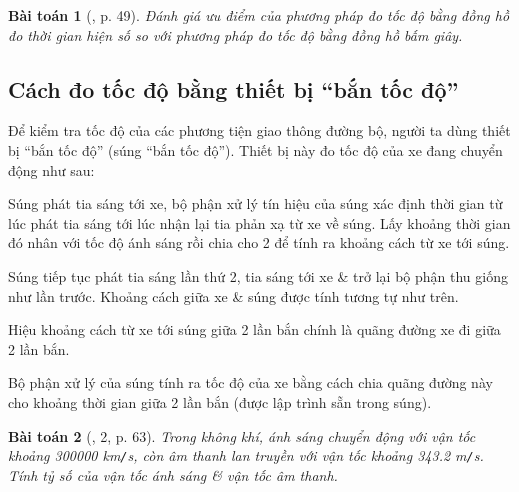 \documentclass{article}
\newtheorem{baitoan}{Bài toán}
\begin{document}
\begin{baitoan}[\cite{SGK_KHTN_7_Canh_Dieu}, p. 49]
	Đánh giá ưu điểm của phương pháp đo tốc độ bằng đồng hồ đo thời gian hiện số so với phương pháp đo tốc độ bằng đồng hồ bấm giây.
\end{baitoan}

\subsection{Cách đo tốc độ bằng thiết bị ``bắn tốc độ''}
Để kiểm tra tốc độ của các phương tiện giao thông đường bộ, người ta dùng thiết bị ``bắn tốc độ'' (súng ``bắn tốc độ''). Thiết bị này đo tốc độ của xe đang chuyển động như sau:

Súng phát tia sáng tới xe, bộ phận xử lý tín hiệu của súng xác định thời gian từ lúc phát tia sáng tới lúc nhận lại tia phản xạ từ xe về súng. Lấy khoảng thời gian đó nhân với tốc độ ánh sáng rồi chia cho 2 để tính ra khoảng cách từ xe tới súng.

Súng tiếp tục phát tia sáng lần thứ 2, tia sáng tới xe \& trở lại bộ phận thu giống như lần trước. Khoảng cách giữa xe \& súng được tính tương tự như trên.

Hiệu khoảng cách từ xe tới súng giữa 2 lần bắn chính là quãng đường xe đi giữa 2 lần bắn.

Bộ phận xử lý của súng tính ra tốc độ của xe bằng cách chia quãng đường này cho khoảng thời gian giữa 2 lần bắn (được lập trình sẵn trong súng).

\noindent{}

\begin{baitoan}[\cite{SGK_Toan_6_Canh_Dieu_tap_2}, 2, p. 63]
	Trong không khí, ánh sáng chuyển động với vận tốc khoảng \emph{300000 km\texttt{/}s}, còn âm thanh lan truyền với vận tốc khoảng \emph{343.2 m\texttt{/}s}. Tính tỷ số của vận tốc ánh sáng \& vận tốc âm thanh.
\end{baitoan}

\end{document}
